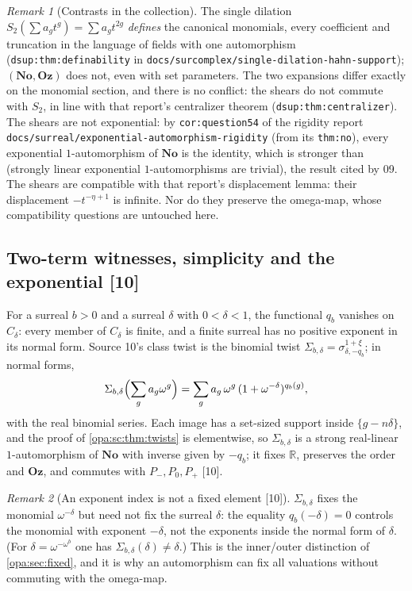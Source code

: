 \documentclass[11pt,oneside]{article}
\numberwithin{equation}{section}
\theoremstyle{definition}
\theoremstyle{remark}
\newtheorem{remark}[remark]{Remark}
\newcommand{\No}{\mathbf{No}}
\newcommand{\Oz}{\mathbf{Oz}}
\newcommand{\R}{\mathbb R}
\newcommand{\src}[1]{\textup{\textsf{\small[#1]}}}
\newcommand{\lbl}[1]{\nolinkurl{#1}}
\newcommand{\fn}[1]{\nolinkurl{#1}}
\begin{document}
\begin{remark}[Contrasts in the collection]\label{opa:rem:contrasts}
The single dilation $S_2(\sum a_gt^g)=\sum a_gt^{2g}$ \emph{defines} the canonical
monomials, every coefficient and truncation in the language of fields with one
automorphism (\lbl{dsup:thm:definability} in
\fn{docs/surcomplex/single-dilation-hahn-support}); $(\No,\Oz)$ does not, even with
set parameters. The two expansions differ exactly on the monomial section, and
there is no conflict: the shears do not commute with $S_2$, in line with that
report's centralizer theorem (\lbl{dsup:thm:centralizer}). The shears are not
exponential: by \lbl{cor:question54} of the rigidity report
\fn{docs/surreal/exponential-automorphism-rigidity} (from its \lbl{thm:no}), every
exponential $1$-automorphism of $\No$ is the identity, which is stronger than
\cite[Proposition 5.2]{KKS} (strongly linear exponential $1$-automorphisms are
trivial), the result cited by 09. The shears are compatible with that report's
displacement lemma: their displacement $-t^{-\eta+1}$ is infinite. Nor do they
preserve the omega-map, whose compatibility questions \cite[Questions 5.6,
5.7]{KKS} are untouched here.
\end{remark}

\subsection{Two-term witnesses, simplicity and the exponential \src{10}}\label{opa:sc:sub:twoterm}

For a surreal $b>0$ and a surreal $\delta$ with $0<\delta<1$, the functional $q_b$
vanishes on $C_\delta$: every member of $C_\delta$ is finite, and a finite surreal has
no positive exponent in its normal form. Source 10's class twist is the binomial
twist $\Sigma_{b,\delta}=\sigma^{1+\xi}_{\delta,-q_b}$; in normal forms,
\begin{equation}\label{opa:sc:eq:classtwist}
 \Sigma_{b,\delta}\Bigl(\sum_g a_g\omega^g\Bigr)=\sum_g a_g\,\omega^g\,(1+\omega^{-\delta})^{q_b(g)},
\end{equation}
with the real binomial series. Each image has a set-sized support inside
$\{g-n\delta\}$, and the proof of \cref{opa:sc:thm:twists} is elementwise, so
$\Sigma_{b,\delta}$ is a strong real-linear $1$-automorphism of $\No$ with inverse
given by $-q_b$; it fixes $\R$, preserves the order and $\Oz$, and commutes with
$P_-,P_0,P_+$ \src{10}.

\begin{remark}[An exponent index is not a fixed element \src{10}]\label{opa:sc:rem:index}
$\Sigma_{b,\delta}$ fixes the monomial $\omega^{-\delta}$ but need not fix the surreal
$\delta$: the equality $q_b(-\delta)=0$ controls the monomial with exponent
$-\delta$, not the exponents inside the normal form of $\delta$. (For
$\delta=\omega^{-\omega^b}$ one has $\Sigma_{b,\delta}(\delta)\ne\delta$.) This is the
inner/outer distinction of \cref{opa:sec:fixed}, and it is why an automorphism
can fix all valuations without commuting with the omega-map.
\end{remark}
\end{document}

